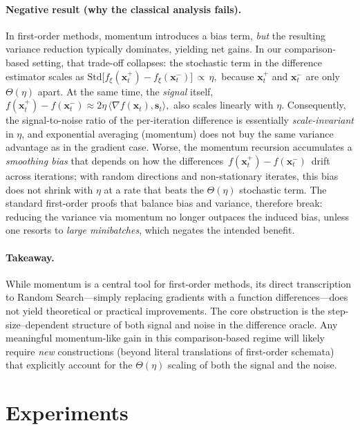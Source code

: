 \documentclass[twoside]{article}
\theoremstyle{plain}
\theoremstyle{definition}
\theoremstyle{remark}
\def\vs{{\bm{s}}}
\def\vx{{\bm{x}}}
\begin{document}
\paragraph{Negative result (why the classical analysis fails).}
In first-order methods, momentum introduces a bias term, \emph{but} the
resulting variance reduction typically dominates, yielding net gains. In our
comparison-based setting, that trade-off collapses: the stochastic term in the
difference estimator scales as
\(
\mathrm{Std}\big[f_\xi(\vx_t^+)-f_\xi(\vx_t^-)\big] \,\propto\, \eta,
\)
because $\vx_t^+$ and $\vx_t^-$ are only $\Theta(\eta)$ apart. At the same
time, the \emph{signal} itself,
\(
f(\vx_t^+)-f(\vx_t^-) \approx 2\eta\,\langle\nabla f(\vx_t),\vs_t\rangle,
\)
also scales linearly with $\eta$. Consequently, the signal-to-noise ratio of
the per-iteration difference is essentially \emph{scale-invariant} in $\eta$,
and exponential averaging (momentum) does not buy the same variance advantage
as in the gradient case. Worse, the momentum recursion accumulates a
\emph{smoothing bias} that depends on how the differences
$\,f(\vx_t^+)-f(\vx_t^-)\,$ drift across iterations; with random directions and
non-stationary iterates, this bias does not shrink with $\eta$ at a rate that
beats the $\Theta(\eta)$ stochastic term. The standard first-order proofs that
balance bias and variance, therefore break: reducing the variance via momentum
no longer outpaces the induced bias, unless one resorts to \emph{large
minibatches}, which negates the intended benefit.

\paragraph{Takeaway.}
While momentum is a central tool for first-order methods, its direct
transcription to Random Search—simply replacing gradients with a function
differences—does not yield theoretical or practical improvements. The core
obstruction is the step-size–dependent structure of both signal and noise in
the difference oracle. Any meaningful momentum-like gain in this
comparison-based regime will likely require \emph{new} constructions (beyond
literal translations of first-order schemata) that explicitly account for the
$\Theta(\eta)$ scaling of both the signal and the noise.


\section{Experiments}\label{sec:experiments}
\end{document}
